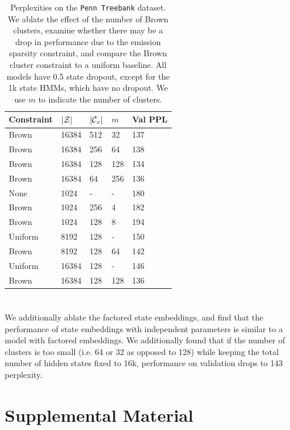 \documentclass[11pt,a4paper]{article}
\begin{document}
\begin{table}[h]
\centering
\begin{tabular}{lllll}
\toprule
Constraint & $|\mathcal{Z}|$ & $|\mathcal{C}_x|$ & $m$ & Val PPL\\
\midrule
Brown & 16384 & 512 & 32  & 137\\
Brown & 16384 & 256 & 64  & 138\\
Brown & 16384 & 128 & 128 & 134\\
Brown & 16384 & 64  & 256 & 136\\
\midrule
None  & 1024 & - & - & 180\\
Brown & 1024 & 256 & 4 & 182\\
Brown & 1024 & 128 & 8 & 194\\
\midrule
Uniform    & 8192    & 128    & -   & 150\\
Brown      & 8192    & 128    & 64  & 142\\
Uniform    & 16384   & 128    & -   & 146\\
Brown      & 16384   & 128    & 128 & 136\\
\bottomrule
\end{tabular}
\caption{\label{tbl:constraint-ablation}
Perplexities on the \texttt{Penn Treebank} dataset.
We ablate the effect of the number of Brown clusters,
examine whether there may be a drop in performance due to the emission sparsity constraint,
and compare the Brown cluster constraint to a uniform baseline.
All models have 0.5 state dropout, except for the 1k state HMMs,
which have no dropout.
We use $m$ to indicate the number of clusters.
}
\end{table}

\section{}
We additionally ablate the factored state embeddings,
and find that the performance of state embeddings with
independent parameters is similar to a model with factored embeddings.
We additionally found that if the number of clusters is too small
(i.e. 64 or 32 as opposed to 128)
while keeping the total number of hidden states fixed to 16k,
performance on validation drops to 143 perplexity.

\section{Supplemental Material}
\label{sec:supplemental}
\end{document}
